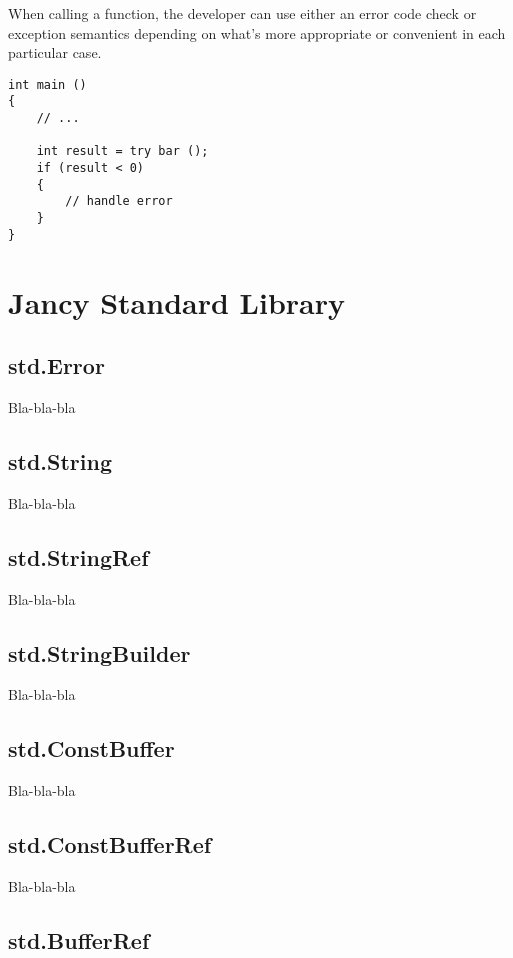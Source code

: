 \documentclass[oneside]{book}
\begin{document}
When calling a function, the developer can use either an error code check or exception semantics depending on what's more appropriate or convenient in each particular case.

\begin{lstlisting}
int main ()
{
    // ...

    int result = try bar ();
    if (result < 0)
    {
        // handle error
    }
}
\end{lstlisting}

\chapter{Jancy Standard Library}

\section{std.Error}

Bla-bla-bla

\section{std.String}

Bla-bla-bla

\section{std.StringRef}

Bla-bla-bla

\section{std.StringBuilder}

Bla-bla-bla

\section{std.ConstBuffer}

Bla-bla-bla

\section{std.ConstBufferRef}

Bla-bla-bla

\section{std.BufferRef}
\end{document}
